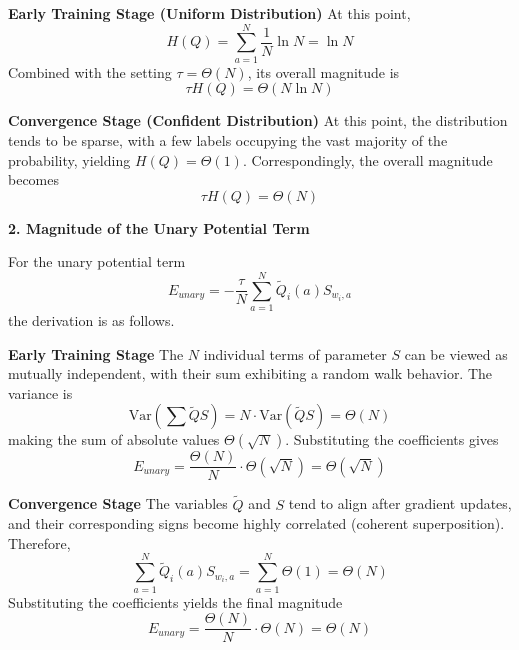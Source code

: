 \documentclass[11pt]{article}
\begin{document}
\textbf{Early Training Stage (Uniform Distribution)} At this point, 
\begin{equation}
    H(Q) = \sum_{a=1}^N \frac{1}{N} \ln N = \ln N
\end{equation}
Combined with the setting $\tau = \Theta(N)$, its overall magnitude is
\begin{equation}
    \tau H(Q) = \Theta(N \ln N)
\end{equation}

\textbf{Convergence Stage (Confident Distribution)} At this point, the distribution tends to be sparse, with a few labels occupying the vast majority of the probability, yielding $H(Q) = \Theta(1)$. Correspondingly, the overall magnitude becomes 
\begin{equation}
    \tau H(Q) = \Theta(N)
\end{equation}

\textbf{2. Magnitude of the Unary Potential Term}

For the unary potential term 
\begin{equation}
    E_{unary} = -\frac{\tau}{N} \sum_{a=1}^N \tilde{Q}_i(a) S_{w_i,a}
\end{equation}
the derivation is as follows.

\textbf{Early Training Stage} The $N$ individual terms of parameter $S$ can be viewed as mutually independent, with their sum exhibiting a random walk behavior. The variance is 
\begin{equation}
    \mathrm{Var}(\sum \tilde{Q} S) = N \cdot \mathrm{Var}(\tilde{Q} S) = \Theta(N)
\end{equation}
making the sum of absolute values $\Theta(\sqrt{N})$. Substituting the coefficients gives 
\begin{equation}
    E_{unary} = \frac{\Theta(N)}{N} \cdot\Theta(\sqrt{N}) = \Theta(\sqrt{N})
\end{equation}

\textbf{Convergence Stage} The variables $\tilde{Q}$ and $S$ tend to align after gradient updates, and their corresponding signs become highly correlated (coherent superposition). Therefore, 
\begin{equation}
    \sum_{a=1}^N \tilde{Q}_i(a) S_{w_i,a} = \sum_{a=1}^N \Theta(1) = \Theta(N)
\end{equation}
Substituting the coefficients yields the final magnitude
\begin{equation}
    E_{unary} = \frac{\Theta(N)}{N}\cdot \Theta(N) = \Theta(N)
\end{equation}
\end{document}
